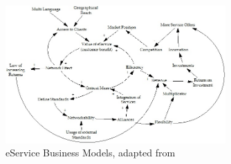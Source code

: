 \begin{figure}[tb]
	\centering
	\includegraphics[width=0.75\textwidth]{gfx/cld_klueber}
	\caption[eService Business Models]{eService Business Models, adapted from \citet[p. 798]{Klueber2000}}
	\label{fig:cld_kl}
\end{figure}

